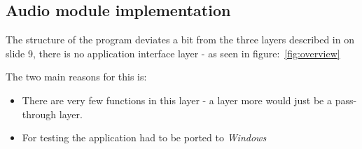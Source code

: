 \subsection{Audio module implementation}

The structure of the program deviates a bit from the three layers described in
\cite{Lect2} on slide 9, there is no application interface layer - as seen in
figure:~\ref{fig:overview}


The two main reasons for this is:
\begin{itemize}
  \item There are very few functions in this layer - a
layer more would just be a pass-through layer.
  \item For testing the application had to be ported to \emph{Windows}
\end{itemize}